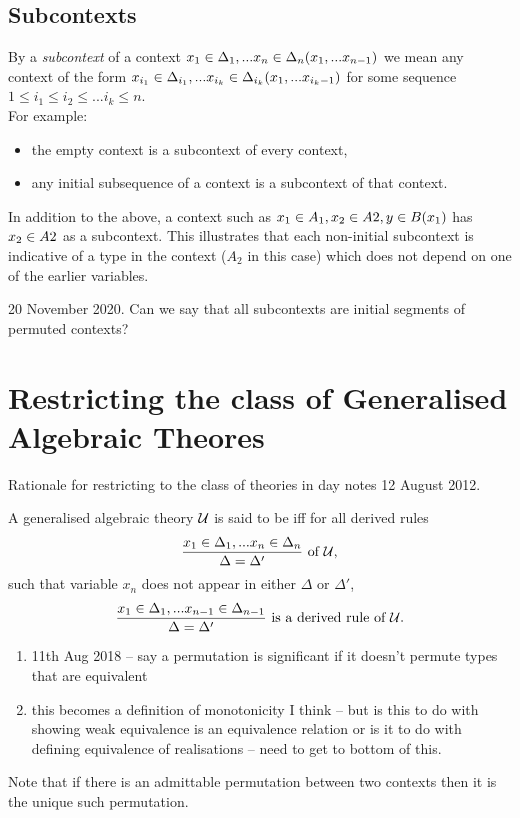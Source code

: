 \documentclass[10pt,a4paper]{scrartcl}
\begin{document}
\subsection{Subcontexts}
By a \textit{subcontext} of a context $x_1 \in \Delta_1,... x_{n} \in \Delta_{n}(x_1,...x_{n-1})$ we mean any context
of the form
$x_{i_1} \in {\Delta}_{i_1},... x_{i_k} \in {\Delta}_{i_k}(x_1,...x_{i_k-1})$ for some sequence 
$1 \leq i_1 \leq i_2 \leq ... i_k \leq n$. \\

\noindent
For example:
\begin {itemize}
\item the empty context is a subcontext of every 
context,
\item any initial subsequence of a context is a subcontext of that context.
\end{itemize}

\noindent
In addition to the above, a context such as $x_1 \in A_1,x_2 \in A2,y \in B(x_1)$ has 
$x_2 \in A2$ as a subcontext. This illustrates that each non-initial subcontext is indicative of a type in the context ($A_2$ in this case)
which does not depend on one of the earlier variables.

\begin{aside}
20 November 2020.
Can we say that all subcontexts are initial segments of permuted contexts?
\end{aside}


\section{Restricting the class of Generalised Algebraic Theores}

Rationale for restricting to the class of theories in day notes 12 August 2012. 
\begin{definition}
A generalised algebraic theory $\mathcal{U}$ is said to be 
iff for all derived rules 
$$
\frac{x_1 \in \Delta_1,... x_{n} \in \Delta_{n}}{\Delta=\Delta'} \mbox{ of $\mathcal{U}$,}
$$
such that variable $x_n$  does not appear in either
$\Delta$ or $\Delta'$,
$$
\frac{x_1 \in \Delta_1,... x_{n-1} \in \Delta_{n-1}}{\Delta=\Delta'} \mbox{ is a derived rule of $\mathcal{U}$.}
$$
\end{definition}

\begin{framed}
\begin{enumerate}
\item 11th Aug 2018 -- say a permutation is significant if it doesn't permute types that are equivalent
\item this becomes a definition of monotonicity I think -- but is this to do with showing weak equivalence 
is an equivalence relation or is it to do with defining equivalence of realisations -- need to get to bottom of this.
\end{enumerate}
\end{framed}
\noindent
Note that if there is an admittable  permutation between two contexts then it is the unique such permutation. 
\end{document}
